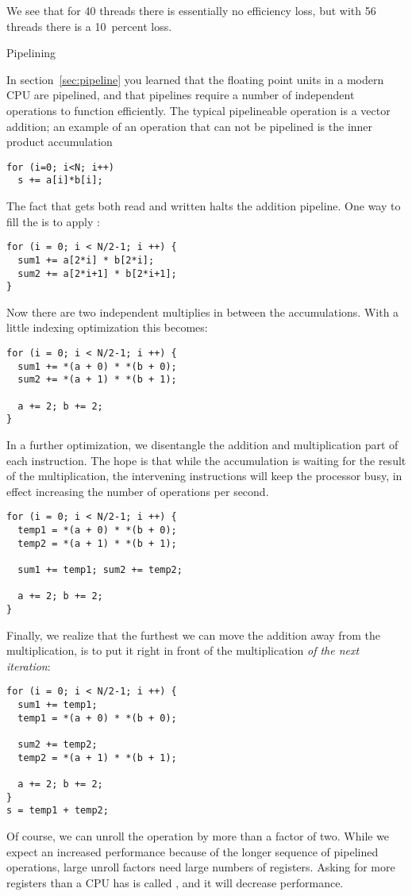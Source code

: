We see that for 40 threads there is essentially no efficiency loss,
but with 56 threads there is a 10~percent loss.

{\scriptsize

}

 {Pipelining}
\label{sec:coding-pipeline}

In section~\ref{sec:pipeline} you learned that the floating point
units in a modern CPU are pipelined, and that pipelines require a
number of independent operations to function efficiently. The typical
pipelineable operation is a vector addition; an example of an
operation that can not be pipelined is the inner product accumulation
\begin{verbatim}
for (i=0; i<N; i++)
  s += a[i]*b[i];
\end{verbatim}
The fact that  gets both read and written halts the addition
pipeline. One way to fill the 
is to apply :
\begin{verbatim}
for (i = 0; i < N/2-1; i ++) {
  sum1 += a[2*i] * b[2*i];
  sum2 += a[2*i+1] * b[2*i+1];
}
\end{verbatim}
Now there are two independent multiplies in between the accumulations.
With a little indexing optimization this becomes:
\begin{verbatim}
for (i = 0; i < N/2-1; i ++) {
  sum1 += *(a + 0) * *(b + 0);
  sum2 += *(a + 1) * *(b + 1);

  a += 2; b += 2;
}
\end{verbatim}

In a further optimization, we disentangle the addition and
multiplication part of each instruction. The hope is that while the
accumulation is waiting for the result of the multiplication, the
intervening instructions will keep the processor busy, in effect
increasing the number of operations per second.
\begin{verbatim}
for (i = 0; i < N/2-1; i ++) {
  temp1 = *(a + 0) * *(b + 0);
  temp2 = *(a + 1) * *(b + 1);

  sum1 += temp1; sum2 += temp2;

  a += 2; b += 2;
}
\end{verbatim}
Finally, we realize that the furthest we can move the addition away
from the multiplication, is to put it right in front of the
multiplication \emph{of the next iteration}:
\begin{verbatim}
for (i = 0; i < N/2-1; i ++) {
  sum1 += temp1;
  temp1 = *(a + 0) * *(b + 0);

  sum2 += temp2;
  temp2 = *(a + 1) * *(b + 1);

  a += 2; b += 2;
}
s = temp1 + temp2;
\end{verbatim}
Of course, we can unroll the operation by more than a factor of
two. While we expect an increased performance because of the longer
sequence of pipelined operations, large unroll factors
need large numbers of registers. Asking for more registers than a CPU
has is called , and it will decrease
performance.

